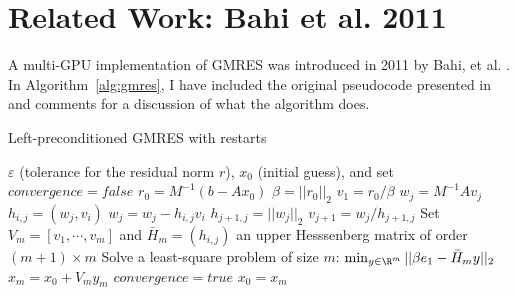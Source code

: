 
\section{Related Work: Bahi et al. 2011}
A multi-GPU implementation of GMRES was introduced in 2011 by Bahi, et al. \cite{Bahi2011}. In Algorithm~\ref{alg:gmres}, I have included the original pseudocode presented in \cite{Bahi2011} and {\color{blue}comments} for a discussion of what the algorithm does. 

\begin{algorithm}                      %
\caption{Left-preconditioned GMRES with restarts}          %
\label{alg:gmres}                           %
\begin{algorithmic}[1]                    %
    \State $\varepsilon$ (tolerance for the residual norm $r$), $x_0$ (initial guess), and set $convergence = false$
    \State $r_0 = M^{-1} (b-Ax_0)$ 
    \State $\beta = ||r_0||_2$
    \State $v_1 = r_0 / \beta$ 
	 \label{alg:gmres_rotation_loop_start} 
			\State $w_j = M^{-1} A v_j$
			\label{alg:gmres_inner_loop_start}  
				\State $h_{i,j} = (w_j, v_i)$ 
				\State $w_j = w_j - h_{i,j} v_i$
			\EndFor \label{alg:gmres_inner_loop_stop}
			\State $h_{j+1, j}  = ||w_j||_2$			
			\State $v_{j+1} = w_j / h_{j+1,j}$		
	\EndFor\label{alg:gmres_rotation_loop_stop} 
	\State Set $V_m = [v_1, \cdots, v_m]$ and $\bar{H}_m = (h_{i,j})$ an upper Hesssenberg matrix of order $(m+1)\times m$
	\State \label{alg:gmres_least_squares} Solve a least-square problem of size $m$: $\min_{y \in \R^m} ||\beta e_1 - \bar{H}_m y||_2$	
	\State $x_m = x_0 + V_m y_m$ \label{alg:gmres_residual_norm}
		\State $convergence = true$
	\EndIf
	\State $x_0 = x_m$
    \EndWhile
\end{algorithmic}
\end{algorithm}

